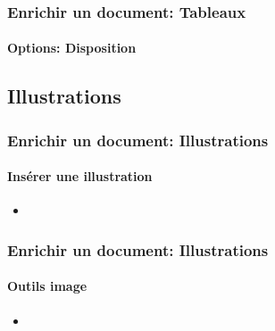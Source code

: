 \documentclass[xcolor=table]{beamer}
\begin{document}
\begin{frame}[t]
\frametitle{Enrichir un document: Tableaux}
\framesubtitle{Options: Disposition}


\end{frame}


\subsection{Illustrations}

\begin{frame}[t]
\frametitle{Enrichir un document: Illustrations}
\framesubtitle{Insérer une illustration}

\begin{minipage}{0.43\textwidth}
	\begin{itemize}
		\item 
	\end{itemize}
\end{minipage}
\begin{minipage}{0.28\textwidth}
	
	
\end{minipage}
\begin{minipage}{0.27\textwidth}	
\end{minipage}


\end{frame}


\begin{frame}[t]
\frametitle{Enrichir un document: Illustrations}
\framesubtitle{Outils image}


\begin{minipage}{0.56\textwidth}
	\begin{itemize}
		\item 
	\end{itemize}
\end{minipage}
\begin{minipage}{0.22\textwidth}
\end{minipage}
\begin{minipage}{0.20\textwidth}	
\end{minipage}

\end{frame}
\end{document}
